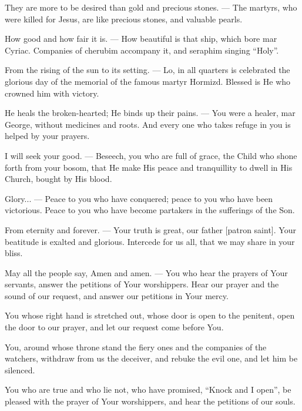 \documentclass[12pt,twoside,a5paper]{article}
\begin{document}
\begin{halfparskip}
  They are more to be desired than gold and precious stones. --- The martyrs, who were killed for Jesus, are like precious stones, and valuable pearls.

  How good and how fair it is. --- How beautiful is that ship, which bore mar Cyriac. Companies of cherubim accompany it, and seraphim singing ``Holy''.

  From the rising of the sun to its setting. --- Lo, in all quarters is celebrated the glorious day of the memorial of the famous martyr Hormizd. Blessed is He who crowned him with victory.

  He heals the broken-hearted; He binds up their pains. --- You were a healer, mar George, without medicines and roots. And every one who takes refuge in you is helped by your prayers.

  I will seek your good. --- Beseech, you who are full of grace, the Child who shone forth from your bosom, that He make His peace and tranquillity to dwell in His Church, bought by His blood.

  Glory... --- Peace to you who have conquered; peace to you who have been victorious. Peace to you who have become partakers in the sufferings of the Son.

  From eternity and forever. --- Your truth is great, our father [patron saint]. Your beatitude is exalted and glorious. Intercede for us all, that we may share in your bliss.

  May all the people say, Amen and amen. --- You who hear the prayers of Your servants, answer the petitions of Your worshippers. Hear our prayer and the sound of our request, and answer our petitions in Your mercy.

  You whose right hand is stretched out, whose door is open to the penitent, open the door to our prayer, and let our request come before You.

  You, around whose throne stand the fiery ones and the companies of the watchers, withdraw from us the deceiver, and rebuke the evil one, and let him be silenced.

  You who are true and who lie not, who have promised, ``Knock and I open'', be pleased with the prayer of Your worshippers, and hear the petitions of our souls.
\end{halfparskip}

\end{document}
